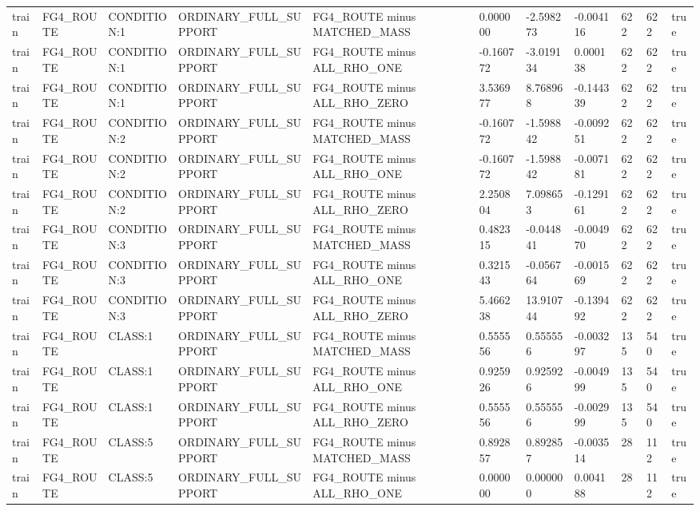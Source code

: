 \begin{tabular}{lllllllllll}
train & FG4\_ROUTE & CONDITION:1 & ORDINARY\_FULL\_SUPPORT & FG4\_ROUTE minus MATCHED\_MASS & 0.000000 & -2.598273 & -0.004116 & 622 & 622 & true \\
train & FG4\_ROUTE & CONDITION:1 & ORDINARY\_FULL\_SUPPORT & FG4\_ROUTE minus ALL\_RHO\_ONE & -0.160772 & -3.019134 & 0.000138 & 622 & 622 & true \\
train & FG4\_ROUTE & CONDITION:1 & ORDINARY\_FULL\_SUPPORT & FG4\_ROUTE minus ALL\_RHO\_ZERO & 3.536977 & 8.768968 & -0.144339 & 622 & 622 & true \\
train & FG4\_ROUTE & CONDITION:2 & ORDINARY\_FULL\_SUPPORT & FG4\_ROUTE minus MATCHED\_MASS & -0.160772 & -1.598842 & -0.009251 & 622 & 622 & true \\
train & FG4\_ROUTE & CONDITION:2 & ORDINARY\_FULL\_SUPPORT & FG4\_ROUTE minus ALL\_RHO\_ONE & -0.160772 & -1.598842 & -0.007181 & 622 & 622 & true \\
train & FG4\_ROUTE & CONDITION:2 & ORDINARY\_FULL\_SUPPORT & FG4\_ROUTE minus ALL\_RHO\_ZERO & 2.250804 & 7.098653 & -0.129161 & 622 & 622 & true \\
train & FG4\_ROUTE & CONDITION:3 & ORDINARY\_FULL\_SUPPORT & FG4\_ROUTE minus MATCHED\_MASS & 0.482315 & -0.044841 & -0.004970 & 622 & 622 & true \\
train & FG4\_ROUTE & CONDITION:3 & ORDINARY\_FULL\_SUPPORT & FG4\_ROUTE minus ALL\_RHO\_ONE & 0.321543 & -0.056764 & -0.001569 & 622 & 622 & true \\
train & FG4\_ROUTE & CONDITION:3 & ORDINARY\_FULL\_SUPPORT & FG4\_ROUTE minus ALL\_RHO\_ZERO & 5.466238 & 13.910744 & -0.139492 & 622 & 622 & true \\
train & FG4\_ROUTE & CLASS:1 & ORDINARY\_FULL\_SUPPORT & FG4\_ROUTE minus MATCHED\_MASS & 0.555556 & 0.555556 & -0.003297 & 135 & 540 & true \\
train & FG4\_ROUTE & CLASS:1 & ORDINARY\_FULL\_SUPPORT & FG4\_ROUTE minus ALL\_RHO\_ONE & 0.925926 & 0.925926 & -0.004999 & 135 & 540 & true \\
train & FG4\_ROUTE & CLASS:1 & ORDINARY\_FULL\_SUPPORT & FG4\_ROUTE minus ALL\_RHO\_ZERO & 0.555556 & 0.555556 & -0.002999 & 135 & 540 & true \\
train & FG4\_ROUTE & CLASS:5 & ORDINARY\_FULL\_SUPPORT & FG4\_ROUTE minus MATCHED\_MASS & 0.892857 & 0.892857 & -0.003514 & 28 & 112 & true \\
train & FG4\_ROUTE & CLASS:5 & ORDINARY\_FULL\_SUPPORT & FG4\_ROUTE minus ALL\_RHO\_ONE & 0.000000 & 0.000000 & 0.004188 & 28 & 112 & true \\

\end{tabular}

